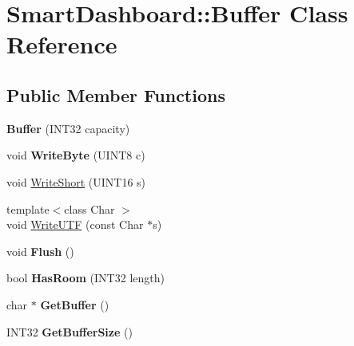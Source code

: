 \hypertarget{classSmartDashboard_1_1Buffer}{\section{\-Smart\-Dashboard\-:\-:\-Buffer \-Class \-Reference}
\label{classSmartDashboard_1_1Buffer}
}
\subsection*{\-Public \-Member \-Functions}
\begin{DoxyCompactItemize}
\item 
\hypertarget{classSmartDashboard_1_1Buffer_a9131c50c2bfe44541ef6aad16bb76732}{{\bfseries \-Buffer} (\-I\-N\-T32 capacity)}\label{classSmartDashboard_1_1Buffer_a9131c50c2bfe44541ef6aad16bb76732}

\item 
\hypertarget{classSmartDashboard_1_1Buffer_abca8ed3aadffc5b6256015ccbedc26cb}{void {\bfseries \-Write\-Byte} (\-U\-I\-N\-T8 c)}\label{classSmartDashboard_1_1Buffer_abca8ed3aadffc5b6256015ccbedc26cb}

\item 
void \hyperlink{classSmartDashboard_1_1Buffer_a5ea50b02ab101b815d2c43874695a3a5}{\-Write\-Short} (\-U\-I\-N\-T16 s)
\item 
{\footnotesize template$<$class Char $>$ }\\void \hyperlink{classSmartDashboard_1_1Buffer_af3b5268322ba5ddc1994d95c169be8e3}{\-Write\-U\-T\-F} (const \-Char $\ast$s)
\item 
\hypertarget{classSmartDashboard_1_1Buffer_a90a26f451f2bf2311ced66b0bd678737}{void {\bfseries \-Flush} ()}\label{classSmartDashboard_1_1Buffer_a90a26f451f2bf2311ced66b0bd678737}

\item 
\hypertarget{classSmartDashboard_1_1Buffer_a144fccca8c9c5c8156fc3a195a962606}{bool {\bfseries \-Has\-Room} (\-I\-N\-T32 length)}\label{classSmartDashboard_1_1Buffer_a144fccca8c9c5c8156fc3a195a962606}

\item 
\hypertarget{classSmartDashboard_1_1Buffer_a1d7a4190277a38c94cb307385ca8bf46}{char $\ast$ {\bfseries \-Get\-Buffer} ()}\label{classSmartDashboard_1_1Buffer_a1d7a4190277a38c94cb307385ca8bf46}

\item 
\hypertarget{classSmartDashboard_1_1Buffer_a21c5266eac03eafd668152a42931fc2f}{\-I\-N\-T32 {\bfseries \-Get\-Buffer\-Size} ()}\label{classSmartDashboard_1_1Buffer_a21c5266eac03eafd668152a42931fc2f}

\end{DoxyCompactItemize}
